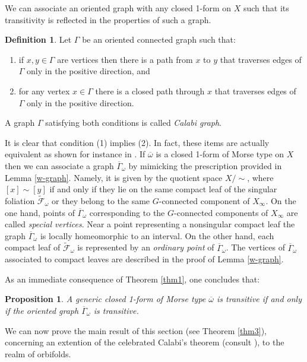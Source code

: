 \documentclass[
  a4paper, 
  reqno, 
  oneside, 
  12pt
]{amsart}
\newtheorem{proposition}[theorem]{Proposition}
\theoremstyle{definition}
\newtheorem{definition}[theorem]{Definition}
\theoremstyle{remark}
\begin{document}
We can associate an oriented graph with any closed 1-form on $X$ such that its transitivity is reflected in the properties of such a graph. 

\begin{definition}
	Let $\Gamma$ be an oriented connected graph such that:
	\begin{enumerate}
		\item if $x,y\in \Gamma$ are vertices then there is a path from $x$ to $y$ that traverses edges of $\Gamma$ only in the positive direction, and 
		\item for any vertex $x\in \Gamma$ there is a closed path through $x$ that traverses edges of $\Gamma$ only in the positive direction.
	\end{enumerate}
	
	A graph $\Gamma$ satisfying both conditions is called \emph{Calabi graph}.
\end{definition}

It is clear that condition (1) implies (2). In fact, these items are actually equivalent as shown for instance in \cite{FKL}. If $\overline{\omega}$ is a closed 1-form of Morse type on $X$ then we can associate a graph $\overline{\Gamma}_\omega$ by mimicking the prescription provided in Lemma \ref{w-graph}. Namely, it is given by the quotient space $X/\sim$, where $[x]\sim [y]$ if and only if they lie on the same compact leaf of the singular foliation $\tilde{\mathcal{F}}_\omega$ or they belong to the same $G$-connected component of $X_\infty$. On the one hand, points of $\overline{\Gamma}_\omega$ corresponding to the $G$-connected components of $X_\infty$ are called \emph{special vertices}. Near a point representing a nonsingular compact leaf the graph $\overline{\Gamma}_\omega$ is locally homeomorphic to an interval. On the other hand, each compact leaf of $\tilde{\mathcal{F}}_\omega$ is represented by an \emph{ordinary 
point} of $\overline{\Gamma}_\omega$. The vertices of $\overline{\Gamma}_\omega$ associated to compact leaves are described in the proof of Lemma \ref{w-graph}. 

As an immediate consequence of Theorem \ref{thm1}, one concludes that:

\begin{proposition}
A generic closed 1-form of Morse type $\overline{\omega}$ is transitive if and only if the oriented graph $\overline{\Gamma}_\omega$ is transitive. 
\end{proposition}

We can now prove the main result of this section (see Theorem \ref{thm3}), concerning an extention of the celebrated Calabi's theorem (consult \cite{Calabi}), to the realm of orbifolds. 
\end{document}
